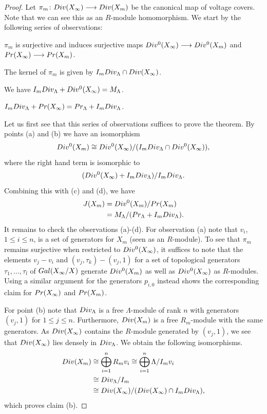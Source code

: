 \documentclass[11pt]{article}
\theoremstyle{definition}
\numberwithin{equation}{section}
\newcommand{\Gal}{\textup{Gal}}
\begin{document}
\begin{proof}
	Let $\pi_m\colon \textup{Div}(X_\infty)\longrightarrow \textup{Div}(X_m)$ be the canonical map of voltage covers. Note that we can see this as an $R$-module homomorphism. We start by the following series of observations:
	\begin{compactenum}[(a)]
		\item $\pi_m$ is surjective and induces surjective maps $\textup{Div}^0(X_\infty)\longrightarrow \textup{Div}^0(X_m)$ and ${\textup{Pr}(X_\infty)\longrightarrow \textup{Pr}(X_m)}$.
		\item The kernel of $\pi_m$ is given by $I_m\textup{Div}_\Lambda\cap \textup{Div}(X_\infty)$.
		\item We have $I_m\textup{Div}_\Lambda+\textup{Div}^0(X_\infty)=M_\Lambda$.
		\item $I_m\textup{Div}_\Lambda+\textup{Pr}(X_\infty)=\textup{Pr}_\Lambda+I_m\textup{Div}_\Lambda$. 
	\end{compactenum}
	Let us first see that this series of observations suffices to prove the theorem.
	By points (a) and (b) we have an isomorphism
	\[\textup{Div}^0(X_m)\cong \textup{Div}^0(X_\infty)/(I_m \textup{Div}_\Lambda\cap \textup{Div}^0(X_\infty)),\] where the right hand term is isomorphic to \[(\textup{Div}^0(X_\infty)+I_m\textup{Div}_\Lambda)/I_m\textup{Div}_\Lambda.\]
	Combining this with (c) and (d), we have
	\begin{align*}
		J(X_m)& = \textup{Div}^0(X_m) / \textup{Pr}(X_m) \\ 
		&=M_\Lambda/(\textup{Pr}_\Lambda+I_m\textup{Div}_\Lambda).
	\end{align*}
	It remains to check the observations (a)-(d). For observation (a) note that $v_i$, ${1\le i\le n}$, is a set of generators for $X_m$ (seen as an $R$-module). 
	To see that $\pi_m$ remains surjective when restricted to $\textup{Div}^0(X_\infty)$, it suffices to note that the elements ${v_{j}-v_{i}}$ and ${(v_j, \tau_k)-(v_{j},1)}$ for a  set of topological generators ${\tau_1,\ldots, \tau_l}$ of $\Gal(X_\infty/X)$ generate $\textup{Div}^0(X_m)$ as well as $\textup{Div}^0(X_\infty)$ as $R$-modules. Using a similar argument for the generators $p_{i,0}$ instead shows the corresponding claim for $\textup{Pr}(X_\infty)$ and $\textup{Pr}(X_m)$.
	
	For point (b) note that $\textup{Div}_\Lambda$ is a free $\Lambda$-module of rank $n$ with generators $(v_j,1)$ for ${1\le j\le n}$. Furthermore, $\textup{Div}(X_m)$ is a free $R_m$-module with the same generators. As $\textup{Div}(X_\infty)$ contains the $R$-module generated by $(v_j,1)$, we see that $\textup{Div}(X_\infty)$ lies densely in $\textup{Div}_\Lambda$. We obtain the following isomorphisms. 
	\begin{align*}
		\textup{Div}(X_m)&\cong \bigoplus_{i=1}^n R_m v_i\cong 
		\bigoplus_{i=1}^n \Lambda/I_m v_i\\ 
		&\cong \textup{Div}_\Lambda/I_m\\
		&\cong \textup{Div}(X_\infty)/(\textup{Div}(X_\infty)\cap I_m\textup{Div}_\Lambda),\end{align*} which proves claim (b).
	

\end{proof}
\end{document}
